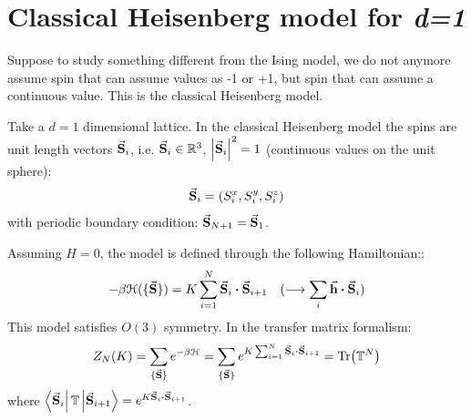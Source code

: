 \documentclass[../main/main.tex]{subfiles}
\begin{document}
\section{Classical Heisenberg model for \emph{d=1} }

Suppose to study something different from the Ising model, we do not anymore assume spin that can assume values as -1 or +1, but spin that can assume a continuous value. This is the classical Heisenberg model.

Take a \( d=1 \) dimensional lattice.
In the classical Heisenberg model the spins are unit length vectors \( \va{S}_i \), i.e. \( \va{S}_i \in \mathbb{R}^3 \), \( \abs{\va{S}_i}^2 = 1 \) (continuous values on the unit sphere):
\begin{equation}
  \va{S}_i = ( S_i^x,S_i^y,S_i^z)
\end{equation}
 with periodic boundary condition: \( \va{S}_{N+1} = \va{S}_1 \).

Assuming \( H=0 \), the model is defined through the following Hamiltonian::
\begin{equation}
  - \beta \mathcal{H} ( \{ \va{S} \}  ) = K \sum_{i=1}^{N} \va{S}_i \vdot \va{S}_{i+1} \quad  (\longrightarrow \sum_{i}^{} \va{h} \vdot \va{S}_i  )
\end{equation}
This model satisfies \( O(3) \) symmetry. In the transfer matrix formalism:
\begin{equation}
  Z_N (K) = \sum_{\{ \va{S} \}  }^{} e^{-\beta \mathcal{H}} = \sum_{\{ \va{S} \}  }^{} e^{K \sum_{i=1}^{N} \va{S}_i \vdot \va{S}_{i+1} } = \Tr(\mathbb{T}^N)
\end{equation}
where \( \bra{\va{S}_i} \mathbb{T} \ket{\va{S}_{i+1}} = e^{K \va{S}_i \vdot \va{S}_{i+1}} \).
\end{document}
